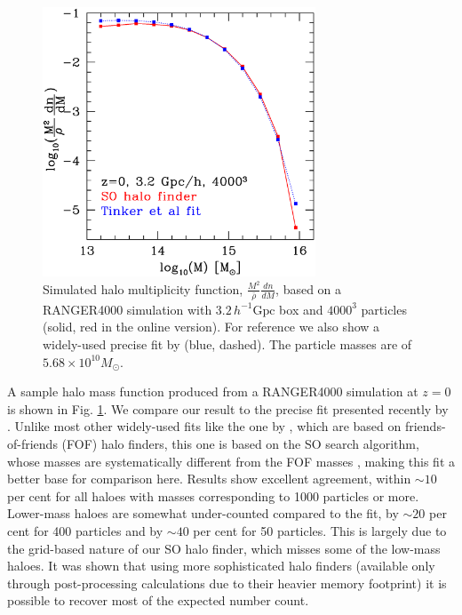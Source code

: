 \documentclass[useAMS,usenatbib]{mn2e}
\begin{document}
\begin{figure}%
  \begin{center}
    \includegraphics[width=3.2in]{graphs/mf_z0_Tinker.eps}
  \end{center}
  \caption{Simulated halo multiplicity function, 
    $\frac{M^2}{\bar{\rho}}\frac{dn}{dM}$, based on a
    RANGER4000 simulation with $3.2\,h^{-1} \mbox{Gpc}$ box and $4000^3$ 
    particles (solid, red in the online version). For reference we also show a widely-used 
    precise fit by \citet{2008ApJ...688..709T} (blue, dashed). 
    The particle masses are of $5.68 \times 10^{10} M_{\odot}$.
    \label{mf}}
\end{figure}

A sample halo mass function produced  from a RANGER4000 simulation at $z=0$ is shown in Fig. \ref{mf}. We compare our result to the 
precise fit presented recently by \citet{2008ApJ...688..709T}. Unlike most
other widely-used fits like the one by \citet{2002MNRAS.329...61S}, which are based on friends-of-friends (FOF)
halo finders, this one is based on the
SO search algorithm, whose masses are systematically different 
from the FOF masses \citep[e.g.][]{2007MNRAS.374....2R,2008ApJ...688..709T}, 
making this fit a better base for comparison here. Results show excellent
agreement, within $\sim10$ per cent for all haloes with masses corresponding to
1000 particles or more. Lower-mass haloes are somewhat under-counted compared
to the \citet{2008ApJ...688..709T} fit, by $\sim20$ per cent for 400 particles and 
by $\sim40$ per cent for 50 particles. This is largely due to the grid-based nature of our
SO halo finder, which misses some of the low-mass haloes. It was shown that using more sophisticated
halo finders (available only through post-processing calculations due to their heavier memory
footprint) it is possible to recover most of the expected number count.
\end{document}
